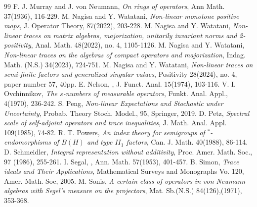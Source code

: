 \documentclass[a4paper,12pt]{amsart}
\begin{document}
\begin{thebibliography}{99}
F. J. Murray and J. von Neumann, 
\textit{On rings of operators},
Ann Math. 37(1936), 116-229.
M. Nagisa and Y. Watatani, 
\textit{Non-linear monotone positive maps}, 
J. Operator Theory, 87(2022), 203-228. 
M. Nagisa and Y. Watatani, 
\textit{Non-linear traces on matrix algebras, majorization, unitarily invariant norms and 2-positivity}, 
Anal. Math. 48(2022), no. 4, 1105-1126.
M. Nagisa and Y. Watatani, 
\textit{Non-linear traces on the algebras of compact operators and majorization}, 
Indag. Math. (N.S.) 34(2023), 724-751.
M. Nagisa and Y. Watatani, 
\textit{Non-linear traces on semi-finite factors and generalized singular values}, 
Positivity 28(2024), no. 4, paper number 57, 40pp.
E. Nelson, 
,
J. Funct. Anal. 15(1974), 103-116.
V. I. Ovchinnikov,  
\textit{The $s$-numbers of measurable operators}, 
Funkt. Anal. Appl., 4(1970), 236-242.
S. Peng,
\textit{Non-linear Expectations and Stochastic under Uncertainty}, 
Probab. Theory Stoch. Model., 95, Springer, 2019. 
D. Petz, 
\textit{Spectral scale of self-adjoint operators and trace inequalities}, 
J. Math. Anal. Appl. 109(1985), 74-82.  
R. T. Powers,  
\textit{An index theory for semigroups of $^*$-endomorphisms of $B(H)$ and type $II_1$ factors}, 
Can. J. Math. 40(1988), 86-114.  
D. Schmeidler, 
\textit{Integral representation without additivity}, 
Proc. Amer. Math. Soc., 97 (1986), 255-261.
I. Segal, 
, 
Ann. Math. 57(1953), 401-457. 
B. Simon,
\textit{Trace ideals and Their Applications},
Mathematical Surveys and Monographs Vo. 120, Amer. Math. Soc, 2005.
M. Sonis, 
\textit{A certain class of operators in von Neumann algebras with Segel's measure on the projectors},
Mat. Sb.(N.S.) 84(126),(1971), 353-368.

\end{thebibliography}
\end{document}
